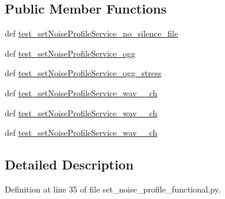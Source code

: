 \subsection*{Public Member Functions}
\begin{DoxyCompactItemize}
\item 
def \hyperlink{classset__noise__profile__functional_1_1AudioProcessingSetNoiseProfileFunc_a3ef448c951814ca99645f5ff4a85e851}{test\-\_\-set\-Noise\-Profile\-Service\-\_\-no\-\_\-silence\-\_\-file}
\item 
def \hyperlink{classset__noise__profile__functional_1_1AudioProcessingSetNoiseProfileFunc_ad2eae45e356d7e357a61cf063282b436}{test\-\_\-set\-Noise\-Profile\-Service\-\_\-ogg}
\item 
def \hyperlink{classset__noise__profile__functional_1_1AudioProcessingSetNoiseProfileFunc_a488cabdfe725f1a993a42b7d8c6776d0}{test\-\_\-set\-Noise\-Profile\-Service\-\_\-ogg\-\_\-stress}
\item 
def \hyperlink{classset__noise__profile__functional_1_1AudioProcessingSetNoiseProfileFunc_a0e02d0dbae0d788d73b8170a9d48650b}{test\-\_\-set\-Noise\-Profile\-Service\-\_\-wav\-\_\-\_\-ch}
\item 
def \hyperlink{classset__noise__profile__functional_1_1AudioProcessingSetNoiseProfileFunc_a84cd05103322edf9ed9290785b3493b4}{test\-\_\-set\-Noise\-Profile\-Service\-\_\-wav\-\_\-\_\-ch}
\item 
def \hyperlink{classset__noise__profile__functional_1_1AudioProcessingSetNoiseProfileFunc_a263ecbeb3db73f82958ef45b68a9db30}{test\-\_\-set\-Noise\-Profile\-Service\-\_\-wav\-\_\-\_\-ch}
\end{DoxyCompactItemize}


\subsection{Detailed Description}


Definition at line 35 of file set\-\_\-noise\-\_\-profile\-\_\-functional.\-py.



